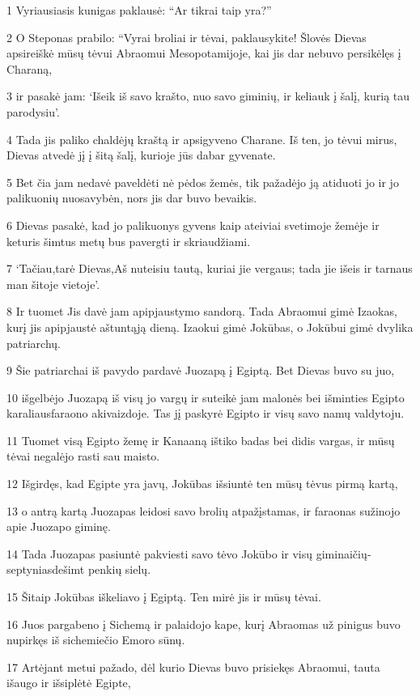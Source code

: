 \par 1 Vyriausiasis kunigas paklausė: “Ar tikrai taip yra?” 
\par 2 O Steponas prabilo: “Vyrai broliai ir tėvai, paklausykite! Šlovės Dievas apsireiškė mūsų tėvui Abraomui Mesopotamijoje, kai jis dar nebuvo persikėlęs į Charaną, 
\par 3 ir pasakė jam: ‘Išeik iš savo krašto, nuo savo giminių, ir keliauk į šalį, kurią tau parodysiu’. 
\par 4 Tada jis paliko chaldėjų kraštą ir apsigyveno Charane. Iš ten, jo tėvui mirus, Dievas atvedė jį į šitą šalį, kurioje jūs dabar gyvenate. 
\par 5 Bet čia jam nedavė paveldėti nė pėdos žemės, tik pažadėjo ją atiduoti jo ir jo palikuonių nuosavybėn, nors jis dar buvo bevaikis. 
\par 6 Dievas pasakė, kad jo palikuonys gyvens kaip ateiviai svetimoje žemėje ir keturis šimtus metų bus pavergti ir skriaudžiami. 
\par 7 ‘Tačiau,­tarė Dievas,­Aš nuteisiu tautą, kuriai jie vergaus; tada jie išeis ir tarnaus man šitoje vietoje’. 
\par 8 Ir tuomet Jis davė jam apipjaustymo sandorą. Tada Abraomui gimė Izaokas, kurį jis apipjaustė aštuntąją dieną. Izaokui gimė Jokūbas, o Jokūbui gimė dvylika patriarchų. 
\par 9 Šie patriarchai iš pavydo pardavė Juozapą į Egiptą. Bet Dievas buvo su juo, 
\par 10 išgelbėjo Juozapą iš visų jo vargų ir suteikė jam malonės bei išminties Egipto karaliaus­faraono akivaizdoje. Tas jį paskyrė Egipto ir visų savo namų valdytoju. 
\par 11 Tuomet visą Egipto žemę ir Kanaaną ištiko badas bei didis vargas, ir mūsų tėvai negalėjo rasti sau maisto. 
\par 12 Išgirdęs, kad Egipte yra javų, Jokūbas išsiuntė ten mūsų tėvus pirmą kartą, 
\par 13 o antrą kartą Juozapas leidosi savo brolių atpažįstamas, ir faraonas sužinojo apie Juozapo giminę. 
\par 14 Tada Juozapas pasiuntė pakviesti savo tėvo Jokūbo ir visų giminaičių­septyniasdešimt penkių sielų. 
\par 15 Šitaip Jokūbas iškeliavo į Egiptą. Ten mirė jis ir mūsų tėvai. 
\par 16 Juos pargabeno į Sichemą ir palaidojo kape, kurį Abraomas už pinigus buvo nupirkęs iš sichemiečio Emoro sūnų. 
\par 17 Artėjant metui pažado, dėl kurio Dievas buvo prisiekęs Abraomui, tauta išaugo ir išsiplėtė Egipte, 
